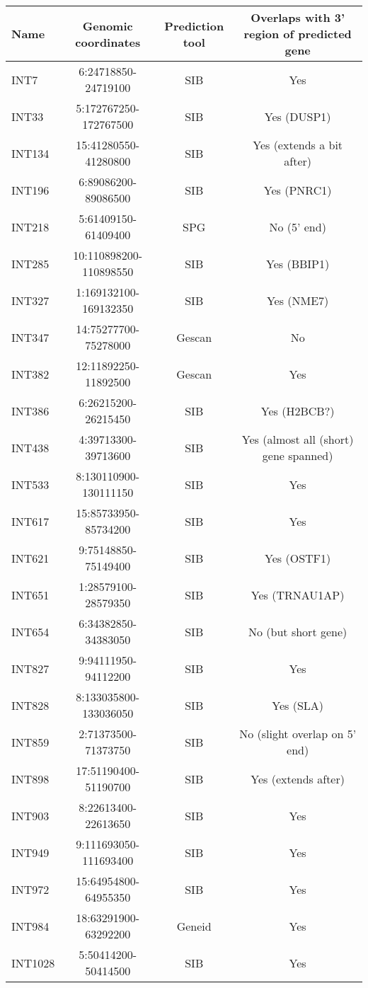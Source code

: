 \begin{table}[h]
    \tiny
    \centering
    \begin{tabular}{lccc}
        \toprule
        Name & Genomic coordinates & Prediction tool & Overlaps with 3' region of predicted gene \\
        \midrule
	INT7 & 6:24718850-24719100 & SIB & Yes \\
	INT33 & 5:172767250-172767500 & SIB & Yes (DUSP1) \\
	INT134 & 15:41280550-41280800 & SIB & Yes (extends a bit after) \\
	INT196 & 6:89086200-89086500 & SIB & Yes (PNRC1) \\
	INT218 & 5:61409150-61409400 & SPG & No (5' end) \\
	INT285 & 10:110898200-110898550 & SIB & Yes (BBIP1) \\
	INT327 & 1:169132100-169132350 & SIB & Yes (NME7) \\
	INT347 & 14:75277700-75278000 & Gescan & No \\
	INT382 & 12:11892250-11892500 & Gescan & Yes \\
	INT386 & 6:26215200-26215450 & SIB & Yes (H2BCB?) \\
	INT438 & 4:39713300-39713600 & SIB & Yes (almost all (short) gene spanned) \\
	INT533 & 8:130110900-130111150 & SIB & Yes \\
	INT617 & 15:85733950-85734200 & SIB & Yes \\
	INT621 & 9:75148850-75149400 & SIB & Yes (OSTF1) \\
	INT651 & 1:28579100-28579350 & SIB & Yes (TRNAU1AP) \\
	INT654 & 6:34382850-34383050 & SIB & No (but short gene)\\
	INT827 & 9:94111950-94112200 & SIB & Yes \\
	INT828 & 8:133035800-133036050 & SIB & Yes (SLA) \\
	INT859 & 2:71373500-71373750 & SIB & No (slight overlap on 5' end) \\
	INT898 & 17:51190400-51190700 & SIB & Yes (extends after)\\
	INT903 & 8:22613400-22613650 & SIB & Yes \\
	INT949 & 9:111693050-111693400 & SIB & Yes \\
	INT972 & 15:64954800-64955350 & SIB & Yes \\
	INT984 & 18:63291900-63292200 & Geneid & Yes \\
	INT1028 & 5:50414200-50414500 & SIB & Yes \\

\end{tabular}
\end{table}
